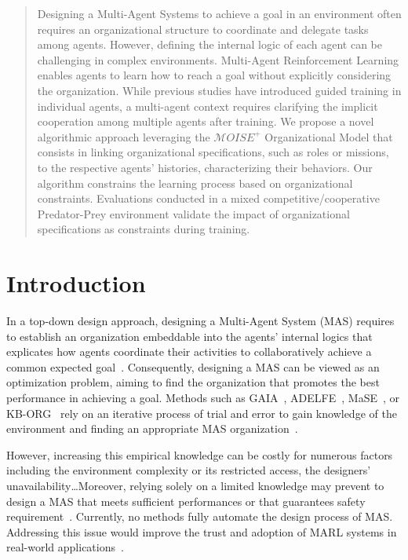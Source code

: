 \documentclass[runningheads]{llncs}
\theoremstyle{freethm}
\theoremstyle{proofoutline}
\begin{document}
\begin{abstract}

    Designing a Multi-Agent Systems to achieve a goal in an environment often requires an organizational structure to coordinate and delegate tasks among agents. However, defining the internal logic of each agent can be challenging in complex environments. Multi-Agent Reinforcement Learning enables agents to learn how to reach a goal without explicitly considering the organization.
    While previous studies have introduced guided training in individual agents, a multi-agent context requires clarifying the implicit cooperation among multiple agents after training. We propose a novel algorithmic approach leveraging the $\mathcal{M}OISE^+$ Organizational Model that consists in linking organizational specifications, such as roles or missions, to the respective agents' histories, characterizing their behaviors. Our algorithm constrains the learning process based on organizational constraints. Evaluations conducted in a mixed competitive/cooperative Predator-Prey environment validate the impact of organizational specifications as constraints during training.

\end{abstract}


\section{Introduction}

In a top-down design approach, designing a Multi-Agent System (MAS) requires to establish an organization embeddable into the agents' internal logics that explicates how agents coordinate their activities to collaboratively achieve a common expected goal~\cite{Picard2009}.
%
Consequently, designing a MAS can be viewed as an optimization problem, aiming to find the organization that promotes the best performance in achieving a goal. Methods such as GAIA~\cite{Wooldridge2000,Cernuzzi2014}, ADELFE~\cite{Mefteh2015}, MaSE~\cite{Deloach2001}, or KB-ORG~\cite{Sims2008} rely on an iterative process of trial and error to gain knowledge of the environment and finding an appropriate MAS organization~\cite{Sims2008}.

However, increasing this empirical knowledge can be costly for numerous factors including the environment complexity or its restricted access, the designers' unavailability\dots Moreover, relying solely on a limited knowledge may prevent to design a MAS that meets sufficient performances or that guarantees safety requirement~\cite{Mefteh2013}. Currently, no methods fully automate the design process of MAS. Addressing this issue would improve the trust and adoption of MARL systems in real-world applications~\cite{kok2006collaborative,omidshafiei2019learning}.
\end{document}
